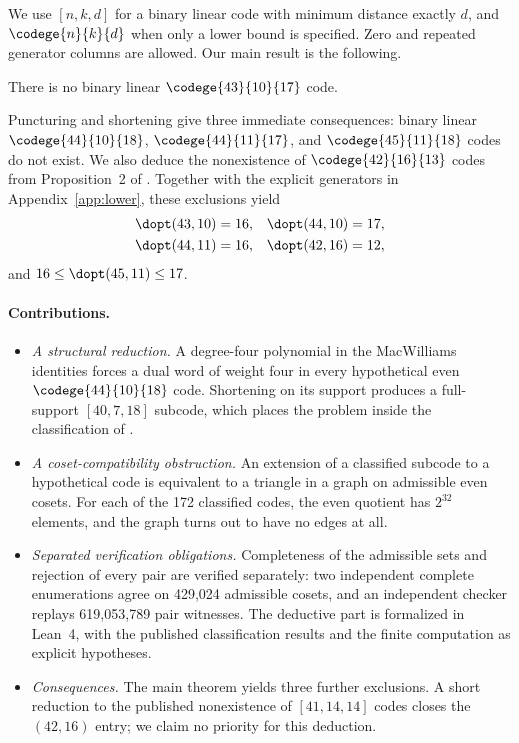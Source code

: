We use $[n,k,d]$ for a binary linear code with minimum distance exactly $d$, and $\codege{n}{k}{d}$ when only a lower bound is specified. Zero and repeated generator columns are allowed. Our main result is the following.

\begin{theorem}\label{thm:main}
There is no binary linear $\codege{43}{10}{17}$ code.
\end{theorem}

Puncturing and shortening give three immediate consequences: binary linear $\codege{44}{10}{18}$, $\codege{44}{11}{17}$, and $\codege{45}{11}{18}$ codes do not exist. We also deduce the nonexistence of $\codege{42}{16}{13}$ codes from Proposition~2 of \citet{bouyuklieva2020}. Together with the explicit generators in Appendix~\ref{app:lower}, these exclusions yield
\begin{align*}
 \dopt(43,10)&=16,&\dopt(44,10)&=17,\\
 \dopt(44,11)&=16,&\dopt(42,16)&=12,
\end{align*}
and $16\le\dopt(45,11)\le17$.

\paragraph{Contributions.}
\begin{itemize}
\item \emph{A structural reduction.} A degree-four polynomial in the MacWilliams identities forces a dual word of weight four in every hypothetical even $\codege{44}{10}{18}$ code. Shortening on its support produces a full-support $[40,7,18]$ subcode, which places the problem inside the classification of \citet{bouyukliev2001}.
\item \emph{A coset-compatibility obstruction.} An extension of a classified subcode to a hypothetical code is equivalent to a triangle in a graph on admissible even cosets. For each of the 172 classified codes, the even quotient has $2^{32}$ elements, and the graph turns out to have no edges at all.
\item \emph{Separated verification obligations.} Completeness of the admissible sets and rejection of every pair are verified separately: two independent complete enumerations agree on 429,024 admissible cosets, and an independent checker replays 619,053,789 pair witnesses. The deductive part is formalized in Lean~4, with the published classification results and the finite computation as explicit hypotheses.
\item \emph{Consequences.} The main theorem yields three further exclusions. A short reduction to the published nonexistence of $[41,14,14]$ codes closes the $(42,16)$ entry; we claim no priority for this deduction.
\end{itemize}

